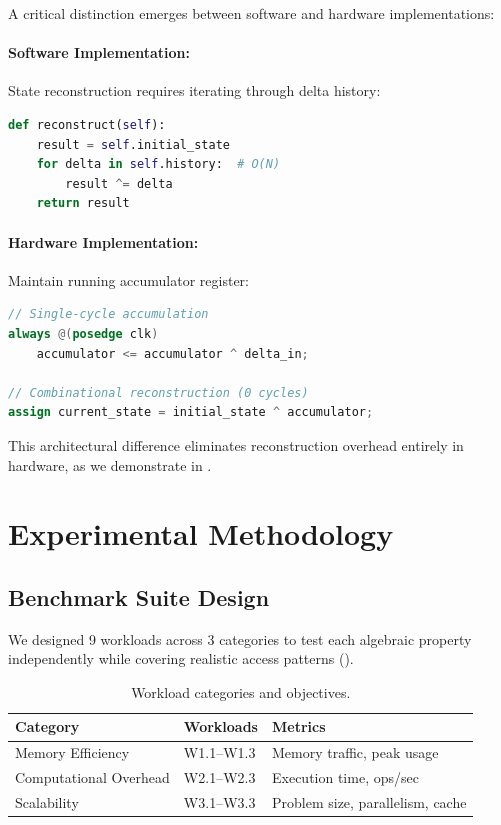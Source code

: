 \documentclass[11pt,letterpaper]{article}
\theoremstyle{plain}
\theoremstyle{definition}
\theoremstyle{remark}
\begin{document}
A critical distinction emerges between software and hardware implementations:

\paragraph{Software Implementation:} State reconstruction requires iterating through delta history:
\begin{lstlisting}[language=Python]
def reconstruct(self):
    result = self.initial_state
    for delta in self.history:  # O(N)
        result ^= delta
    return result
\end{lstlisting}

\paragraph{Hardware Implementation:} Maintain running accumulator register:
\begin{lstlisting}[language=Verilog]
// Single-cycle accumulation
always @(posedge clk)
    accumulator <= accumulator ^ delta_in;

// Combinational reconstruction (0 cycles)
assign current_state = initial_state ^ accumulator;
\end{lstlisting}

This architectural difference eliminates reconstruction overhead entirely in hardware, as we demonstrate in .

\section{Experimental Methodology}
\label{sec:methodology}

\subsection{Benchmark Suite Design}

We designed 9 workloads across 3 categories to test each algebraic property independently while covering realistic access patterns ().

\begin{table}[!htbp]
\centering
\caption{Workload categories and objectives.}
\label{tab:workloads}
\begin{tabular}{@{}lll@{}}
\toprule
\textbf{Category} & \textbf{Workloads} & \textbf{Metrics} \\
\midrule
Memory Efficiency & W1.1--W1.3 & Memory traffic, peak usage \\
Computational Overhead & W2.1--W2.3 & Execution time, ops/sec \\
Scalability & W3.1--W3.3 & Problem size, parallelism, cache \\
\bottomrule
\end{tabular}
\end{table}
\end{document}
